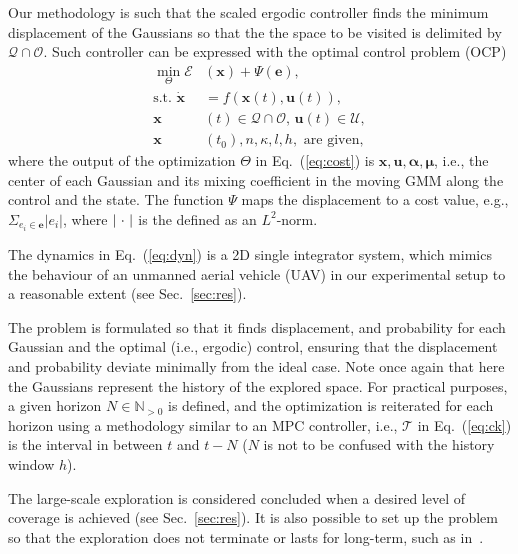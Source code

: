 \documentclass[letterpaper,10pt,conference,twoside]{IEEEtran}
\theoremstyle{definition}
\begin{document}
Our methodology is such that the scaled ergodic controller finds the minimum displacement of the Gaussians so that the the space to be visited is delimited by $\mathcal{Q}\cap\mathcal{O}$. Such controller can be expressed with the optimal control problem (OCP)
\begin{subequations}\label{eq:ocp}\begin{align}
  \min_{\Theta}%
  \mathcal{E}&(\mathbf{x})+\Psi(\mathbf{e}),\label{eq:cost}\\
  \text{s.t. }\dot{\mathbf{x}}&=f(\mathbf{x}(t),\mathbf{u}(t)),\label{eq:dyn}\\
  \mathbf{x}&(t)\in\mathcal{Q}\cap\mathcal{O},\,\mathbf{u}(t)\in\mathcal{U},\label{eq:const}\\
  \mathbf{x}&(t_0),n,\kappa,l,h,\text{ are given},\label{eq:ocpconsttotf}
\end{align}\end{subequations}
where the output of the optimization $\Theta$ in Eq.~(\ref{eq:cost}) is $\mathbf{x},\mathbf{u},\boldsymbol{\alpha},\boldsymbol{\mu}$, i.e., the center of each Gaussian and its mixing coefficient in the moving GMM along the control and the state. The function $\Psi$ maps the displacement to a cost value, e.g., $\Sigma_{e_i\in\mathbf{e}}|e_i|$, where $|\hspace{.2ex}\cdot\hspace{.2ex}|$ is the defined as an $L^2$-norm.

The dynamics in Eq.~(\ref{eq:dyn}) is a 2D single integrator system, which mimics the behaviour of an unmanned aerial vehicle (UAV) in our experimental setup to a reasonable extent (see Sec.~\ref{sec:res}).

The problem is formulated so that it finds displacement, and probability for each Gaussian and the optimal (i.e., ergodic) control, ensuring that the displacement and probability deviate minimally from the ideal case. Note once again that here the Gaussians represent the history of the explored space. For practical purposes, a given horizon $N \in \mathbb{N}_{>0}$ is defined, and the optimization is reiterated for each horizon using a methodology similar to an MPC controller, i.e., $\mathcal{T}$ in Eq.~(\ref{eq:ck}) is the interval in between $t$ and $t-N$ ($N$ is not to be confused with the history window $h$).

The large-scale exploration is considered concluded when a desired level of coverage is achieved (see Sec.~\ref{sec:res}). It is also possible to set up the problem so that the exploration does not terminate or lasts for long-term, such as in~\cite{seewald2022energy}.
\end{document}
